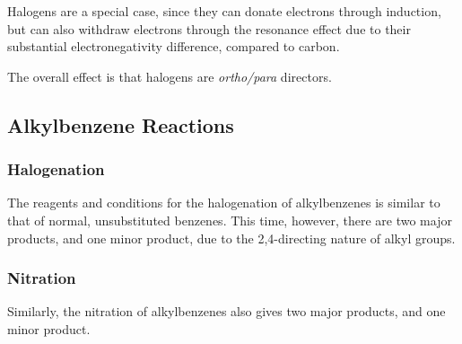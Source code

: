 		\vspace{2.0em}

		Halogens are a special case, since they can donate electrons through induction, but can also withdraw electrons through the
		resonance effect due to their substantial electronegativity difference, compared to carbon.

		The overall effect is that halogens are \textit{ortho/para} directors.




	\pagebreak
	\subsection{Alkylbenzene Reactions}

		\subsubsection{Halogenation}
			The reagents and conditions for the halogenation of alkylbenzenes is similar to that of normal, unsubstituted benzenes. This
			time, however, there are two major products, and one minor product, due to the 2,4-directing nature of alkyl groups.



		\subsubsection{Nitration}

			Similarly, the nitration of alkylbenzenes also gives two major products, and one minor product.


